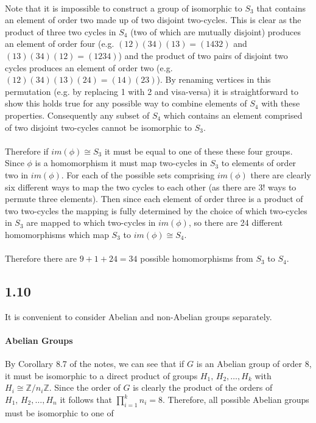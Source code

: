 \documentclass{article}
\begin{document}
\paragraph{}
Note that it is impossible to construct a group of isomorphic to $S_3$ that contains an element 
of order two made up of two disjoint two-cycles. This is clear as the product of three 
two cycles in $S_4$ (two of which are mutually disjoint) produces an element of order four (e.g. 
$(12)(34)(13) = (1432)$ and $(13)(34)(12) = (1234)$) and the product of two pairs of disjoint 
two cycles produces an element of order two (e.g. $(12)(34)(13)(24) = (14)(23)$). By renaming 
vertices in this permutation (e.g. by replacing 1 with 2 and visa-versa) it is straightforward 
to show this holds true for any possible way to combine elements of $S_4$ with these properties.
Consequently any subset of $S_4$ which contains an element comprised of two disjoint two-cycles 
cannot be isomorphic to $S_3$.

\paragraph{}
Therefore if $im(\phi) \cong S_3$ it must be equal to one of these these four groups. 
Since $\phi$ is a homomorphism it must map two-cycles in $S_3$ to elements of order two in $im(\phi)$. 
For each of the possible sets comprising $im(\phi)$ there are clearly six different ways to map 
the two cycles to each other (as there are 3! ways to permute three elements). Then since each 
element of order three is a product of two two-cycles the mapping is fully determined 
by the choice of which two-cycles in $S_3$ are mapped to which two-cycles in $im(\phi)$, so there 
are 24 different homomorphisms which map $S_3$ to $im(\phi) \cong S_4$.

\paragraph{}
Therefore 
there are $9 + 1 + 24 = 34$ possible homomorphisms from $S_3$ to $S_4$. 

\subsection*{1.10}
It is convenient to consider Abelian and non-Abelian groups separately.

\paragraph{Abelian Groups}
By Corollary 8.7 of the notes, we can see that if $G$ is an Abelian group of order 8, it 
must be isomorphic to a direct product of groups $H_1,\, H_2,\dots, H_k$ with $H_i \cong \mathbb{Z}/n_i\mathbb{Z}$. 
Since the order of $G$ is clearly the product of the orders of $H_1,\, H_2, \dots, H_n$ it follows 
that $\prod_{i=1}^{k}n_i = 8$. Therefore, all possible Abelian groups must be isomorphic to 
one of 
\end{document}
